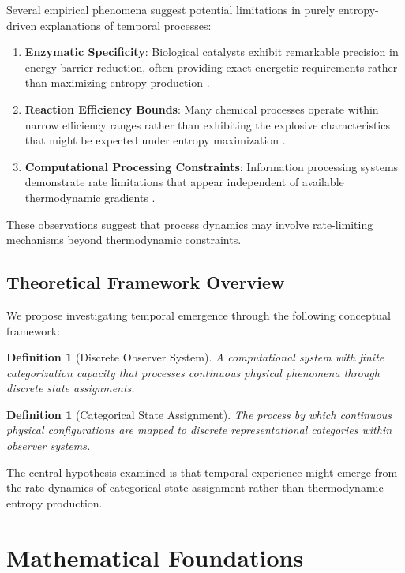 \documentclass[12pt,a4paper]{article}
\newtheorem{definition}[theorem]{Definition}
\theoremstyle{remark}
\begin{document}
Several empirical phenomena suggest potential limitations in purely entropy-driven explanations of temporal processes:

\begin{enumerate}
\item \textbf{Enzymatic Specificity}: Biological catalysts exhibit remarkable precision in energy barrier reduction, often providing exact energetic requirements rather than maximizing entropy production \cite{berg1993biochemistry}.

\item \textbf{Reaction Efficiency Bounds}: Many chemical processes operate within narrow efficiency ranges rather than exhibiting the explosive characteristics that might be expected under entropy maximization \cite{atkins2010physical}.

\item \textbf{Computational Processing Constraints}: Information processing systems demonstrate rate limitations that appear independent of available thermodynamic gradients \cite{landauer1961irreversibility}.
\end{enumerate}

These observations suggest that process dynamics may involve rate-limiting mechanisms beyond thermodynamic constraints.

\subsection{Theoretical Framework Overview}

We propose investigating temporal emergence through the following conceptual framework:

\begin{definition}[Discrete Observer System]
A computational system with finite categorization capacity that processes continuous physical phenomena through discrete state assignments.
\end{definition}

\begin{definition}[Categorical State Assignment]
The process by which continuous physical configurations are mapped to discrete representational categories within observer systems.
\end{definition}

The central hypothesis examined is that temporal experience might emerge from the rate dynamics of categorical state assignment rather than thermodynamic entropy production.

\section{Mathematical Foundations}
\end{document}
